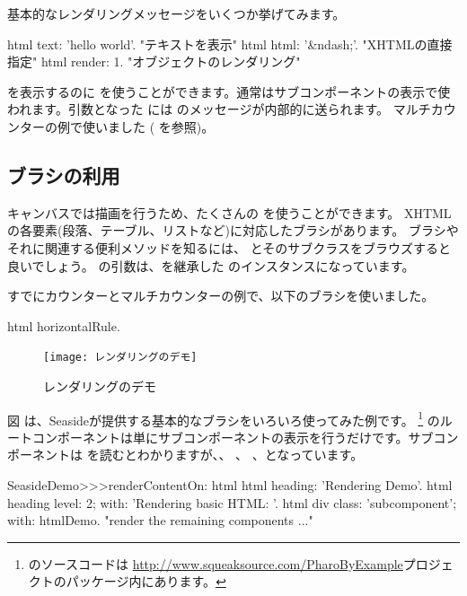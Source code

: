 \documentclass[a4paper,10pt,twoside]{book}
\begin{document}
{{基本的なレンダリングメッセージをいくつか挙げてみます。
\begin{code}{}
html text: 'hello world'.  "テキストを表示"
html html: '&ndash;'.     "XHTMLの直接指定"
html render: 1.              "オブジェクトのレンダリング"
\end{code}

を表示するのに  を使うことができます。通常はサブコンポーネントの表示で使われます。引数となった には のメッセージが内部的に送られます。
マルチカウンターの例で使いました ( を参照)。

\subsection{ブラシの利用}

キャンバスでは描画を行うため、たくさんの  を使うことができます。
XHTMLの各要素(段落、テーブル、リストなど)に対応したブラシがあります。
ブラシやそれに関連する便利メソッドを知るには、 とそのサブクラスをブラウズすると良いでしょう。
  の引数は、を継承した のインスタンスになっています。

すでにカウンターとマルチカウンターの例で、以下のブラシを使いました。
\begin{code}{}
html horizontalRule.
\end{code}

\begin{figure}[ht]
\begin{center}
\texttt{[image: レンダリングのデモ]}
\caption{レンダリングのデモ}
\end{center}
\end{figure}

図 は、Seasideが提供する基本的なブラシをいろいろ使ってみた例です。 \footnote{
 のソースコードは  \url{http://www.squeaksource.com/PharoByExample}プロジェクトのパッケージ内にあります。}  のルートコンポーネントは単にサブコンポーネントの表示を行うだけです。サブコンポーネントは を読むとわかりますが、、 、 、となっています。
 
\needspace{7ex}
\begin{method}[renderdemo]{}
SeasideDemo>>>renderContentOn: html
	html heading: 'Rendering Demo'.
	html heading
		level: 2;
		with: 'Rendering basic HTML: '.
	html div
		class: 'subcomponent';
		with: htmlDemo.
	"render the remaining components ..."
\end{method}

}}
\end{document}
